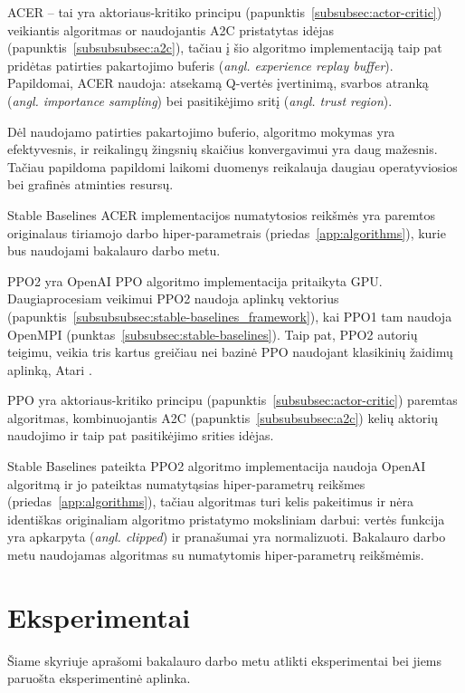 \documentclass{VUMIFPSbakalaurinis}
\begin{document}
\label{subsubsubsec:acer}
{
	ACER \cite{acer} -- tai yra aktoriaus-kritiko principu (papunktis~\ref{subsubsec:actor-critic}) veikiantis algoritmas or naudojantis A2C pristatytas idėjas (papunktis~\ref{subsubsubsec:a2c}), tačiau į šio algoritmo implementaciją taip pat pridėtas patirties pakartojimo buferis (\textit{angl. experience replay buffer}). Papildomai, ACER naudoja: atsekamą Q-vertės įvertinimą, svarbos atranką (\textit{angl. importance sampling}) bei pasitikėjimo sritį (\textit{angl. trust region}).\par
	
	Dėl naudojamo patirties pakartojimo buferio, algoritmo mokymas yra efektyvesnis, ir reikalingų žingsnių skaičius konvergavimui yra daug mažesnis. Tačiau papildoma papildomi laikomi duomenys reikalauja daugiau operatyviosios bei grafinės atminties resursų.\par
	
	Stable Baselines ACER implementacijos numatytosios reikšmės yra paremtos originalaus tiriamojo darbo hiper-parametrais (priedas~\ref{app:algorithms}), kurie bus naudojami bakalauro darbo metu.
}
\label{subsubsubsec:ppo2}
{
	PPO2 yra OpenAI \cite{baselines} PPO algoritmo \cite{ppo} implementacija pritaikyta GPU. Daugiaprocesiam veikimui PPO2 naudoja aplinkų vektorius (papunktis~\ref{subsubsubsec:stable-baselines_framework}), kai PPO1 tam naudoja OpenMPI (punktas~\ref{subsubsec:stable-baselines}). Taip pat, PPO2 autorių teigimu, veikia tris kartus greičiau nei bazinė PPO naudojant klasikinių žaidimų aplinką, Atari \cite{schulman_2019}.\par
	PPO yra aktoriaus-kritiko principu (papunktis~\ref{subsubsec:actor-critic}) paremtas algoritmas, kombinuojantis A2C (papunktis~\ref{subsubsubsec:a2c}) kelių aktorių naudojimo ir taip pat pasitikėjimo srities idėjas.\par
	
	Stable Baselines pateikta PPO2 algoritmo implementacija naudoja OpenAI algoritmą ir jo pateiktas numatytąsias hiper-parametrų reikšmes (priedas~\ref{app:algorithms}), tačiau algoritmas turi kelis pakeitimus ir nėra identiškas originaliam algoritmo pristatymo moksliniam darbui: vertės funkcija yra apkarpyta (\textit{angl. clipped}) ir pranašumai yra normalizuoti. Bakalauro darbo metu naudojamas algoritmas su numatytomis hiper-parametrų reikšmėmis.  
}
\section{Eksperimentai}
{
	Šiame skyriuje aprašomi bakalauro darbo metu atlikti eksperimentai bei jiems paruošta eksperimentinė aplinka.
}
\end{document}
